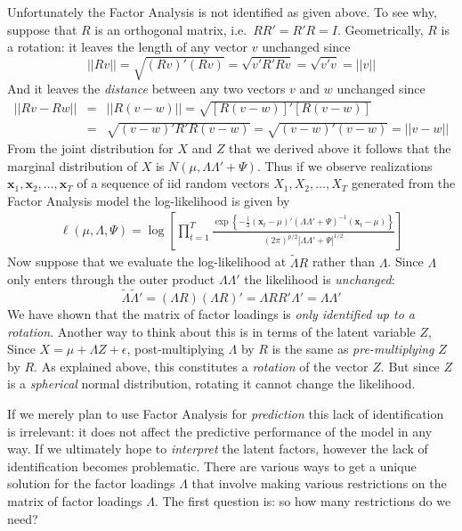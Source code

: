 Unfortunately the Factor Analysis is not identified as given above. To see why, suppose that $R$ is an orthogonal matrix, i.e.\ $RR' = R'R = I$. Geometrically, $R$ is a rotation: it leaves the length of any vector $v$ unchanged since
	$$|| Rv || = \sqrt{(Rv)'(Rv)} = \sqrt{v' R'R v} = \sqrt{v'v} = ||v||$$ 
And it leaves the \emph{distance} between any two vectors $v$ and $w$ unchanged since
	\begin{eqnarray*}
		||Rv - Rw|| &=& ||R(v-w)|| = \sqrt{\left[R(v-w) \right]' \left[ R(v-w)\right]}\\
			&=& \sqrt{(v-w)'R'R(v-w)} = \sqrt{(v-w)'(v-w)} = ||v-w||
	\end{eqnarray*}
From the joint distribution for $X$ and $Z$ that we derived above it follows that the marginal distribution of $X$ is $N(\mu, \Lambda \Lambda' + \Psi)$. Thus if we observe realizations $\mathbf{x}_1, \mathbf{x}_2, \hdots, \mathbf{x}_T$ of a sequence of iid random vectors $X_1, X_2, \hdots, X_T$ generated from the Factor Analysis model the log-likelihood is given by
	\begin{eqnarray*}
		\ell(\mu, \Lambda, \Psi) = \log \left[ \prod_{t = 1}^T \frac{\exp \left\{ -\frac{1}{2} \left(\mathbf{x}_t - \mu \right)' \left(\Lambda \Lambda' + \Psi \right)^{-1} \left(\mathbf{x}_t - \mu \right)\right\}}{(2\pi)^{p/2}\left| \Lambda \Lambda' + \Psi \right|^{1/2}} \right] 
	\end{eqnarray*}
Now suppose that we evaluate the log-likelihood at $\widetilde{\Lambda}R$ rather than $\Lambda$. Since $\Lambda$ only enters through the outer product $\Lambda \Lambda'$ the likelihood is \emph{unchanged}: 
	$$\widetilde{\Lambda} \widetilde{\Lambda}' = (\Lambda R)(\Lambda R)' = \Lambda RR' \Lambda' = \Lambda \Lambda'$$
We have shown that the matrix of factor loadings is \emph{only identified up to a rotation}. Another way to think about this is in terms of the latent variable $Z$, Since $X = \mu + \Lambda Z + \epsilon$, post-multiplying $\Lambda$ by $R$ is the same as \emph{pre-multiplying} $Z$ by $R$. As explained above, this constitutes a \emph{rotation} of the vector $Z$. But since $Z$ is a \emph{spherical} normal distribution, rotating it cannot change the likelihood.


If we merely plan to use Factor Analysis for \emph{prediction} this lack of identification is irrelevant: it does not affect the predictive performance of the model in any way. If we ultimately hope to \emph{interpret} the latent factors, however the lack of identification becomes problematic. There are various ways to get a unique solution for the factor loadings $\Lambda$ that involve making various restrictions on the matrix of factor loadings $\Lambda$. The first question is: so how many restrictions do we need?

